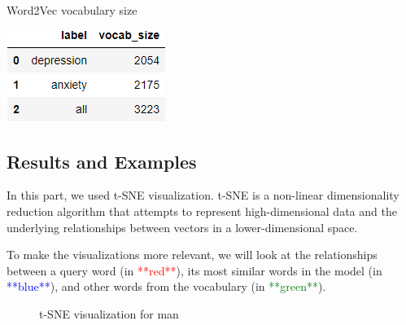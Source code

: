 \documentclass[12pt, a4paper]{article}
\begin{document}
	\begin{table}[H]
		\caption{Word2Vec vocabulary size} 
		\centering 
		\vspace{5mm} 
		\includegraphics[width=0.5\linewidth]{../reports/images/w2v_vocab-size.png}
		\label{w2v_vocab-size} 
	\end{table}
	
	
	\subsection{Results and Examples}
	In this part, we used t-SNE visualization. t-SNE is a non-linear dimensionality reduction algorithm that attempts to represent high-dimensional data and the underlying relationships between vectors in a lower-dimensional space.
	
	To make the visualizations more relevant, we will look at the relationships between a query word (in \textcolor{red}{**red**}), its most similar words in the model (in \textcolor{blue}{**blue**}), and other words from the vocabulary (in \textcolor{green}{**green**}).
	\begin{figure}[H]
		\caption{t-SNE visualization for man}
		\label{word2vec_depression_man}
	\end{figure}
	
\end{document}
